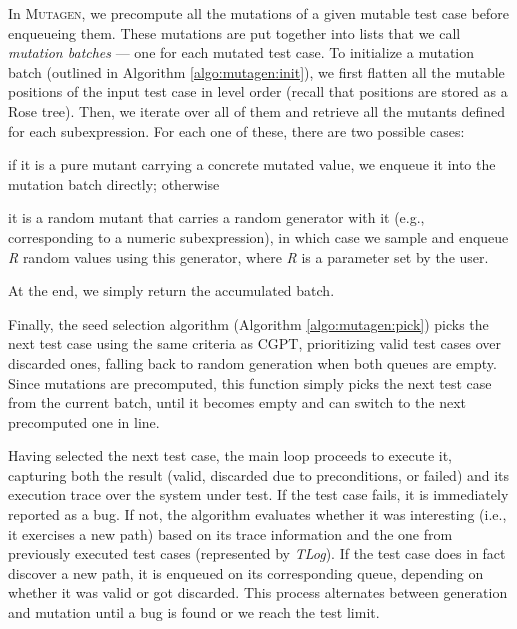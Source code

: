 \documentclass[sigconf, anonymous, review]{acmart}
\newcommand{\mutagen}{\textsc{Mutagen}\xspace}
\begin{document}
In \mutagen, we precompute all the mutations of a given mutable test case before
enqueueing them.
%
These mutations are put together into lists that we call \emph{mutation batches}
--- one for each mutated test case.
%
To initialize a mutation batch (outlined in Algorithm \ref{algo:mutagen:init}),
we first flatten all the mutable positions of the input test case in level order
(recall that positions are stored as a Rose tree).
%
Then, we iterate over all of them and retrieve all the mutants defined for each
subexpression.
%
For each one of these, there are two possible cases:
%
\begin{inparaenum}
\item if it is a pure mutant carrying a concrete mutated value, we enqueue it
  into the mutation batch directly; otherwise
\item it is a random mutant that carries a random generator with it (e.g.,
  corresponding to a numeric subexpression), in which case we sample and enqueue
  \textit{R} random values using this generator, where \textit{R} is a parameter
  set by the user.
\end{inparaenum}
%
At the end, we simply return the accumulated batch.


Finally, the seed selection algorithm (Algorithm \ref{algo:mutagen:pick}) picks
the next test case using the same criteria as CGPT, prioritizing valid test
cases over discarded ones, falling back to random generation when both queues
are empty.
%
Since mutations are precomputed, this function simply picks the next test case
from the current batch, until it becomes empty and can switch to the next
precomputed one in line.


Having selected the next test case, the main loop proceeds to execute it,
capturing both the result (valid, discarded due to preconditions, or failed)
and its execution trace over the system under test.
%
If the test case fails, it is immediately reported as a bug.
%
If not, the algorithm evaluates whether it was interesting (i.e., it exercises a
new path) based on its trace information and the one from previously executed
test cases (represented by \textit{TLog}).
%
If the test case does in fact discover a new path, it is enqueued on its
corresponding queue, depending on whether it was valid or got discarded.
%
%
This process alternates between generation and mutation until a bug is found or
we reach the test limit.
\end{document}
